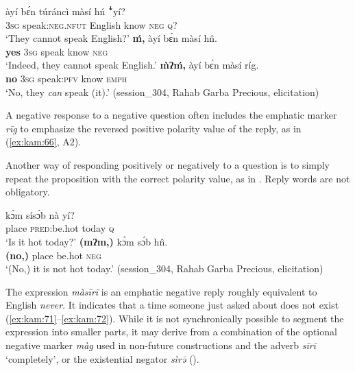 \documentclass[output=paper,colorlinks,citecolor=brown]{langscibook}
\begin{document}
\ea\label{ex:kam:66}
    \begin{xlist}[A2: ]
    \label{ex:kam:66Q}
        \gll àyí bɛ́n túráncì màsí hń ꜜyí?\\
            \textsc{3sg} speak:\textsc{neg}.\textsc{nfut} English know \textsc{neg} \textsc{q}?\\
        \glt ‘They cannot speak English?’
    \label{ex:kam:67}
        \gll \textbf{ḿ,} àyí bɛ́n màsí h\^{n}.\\
            \textbf{yes} \textsc{3sg} speak know \textsc{neg}\\
        \glt ‘Indeed, they cannot speak English.’
    \label{ex:kam:68}
        \gll \textbf{\`{m}ʔḿ,} àyí bɛ́n màsí ríg.\\
            \textbf{no} \textsc{3sg} speak:\textsc{pfv} know \textsc{emph}\\
        \glt  ‘No, they \textit{can} speak (it).’ (session\_304, Rahab Garba Precious, elicitation)
    \end{xlist}
\z 

A negative response to a negative question often includes the emphatic marker \textit{rīg} to emphasize the reversed positive polarity value of the reply, as in (\ref{ex:kam:66}, A2).

Another way of responding positively or negatively to a question is to simply repeat the proposition with the correct polarity value, as in . Reply words are not obligatory.
 
\ea\label{ex:kam:69}
    \begin{xlist}[A2: ]
    \label{ex:kam:69Q}
        \gll kɔ̀m sísɔ́b nà yí?\\
              place \textsc{pred}:be.hot today \textsc{q}\\
        \glt ‘Is it hot today?’
    \label{ex:kam:70}
        \gll \textbf{(mʔm,)} kɔ̀m sɔ́b h\^{n}.\\
            \textbf{(no,)} place be.hot \textsc{neg}\\
        \glt ‘(No,) it is not hot today.’ (session\_304, Rahab Garba Precious, elicitation)
    \end{xlist}
\z 

The expression \textit{màsīrī} is an emphatic negative reply roughly equivalent to English \textit{never}. It indicates that a time someone just asked about does not exist (\ref{ex:kam:71}--\ref{ex:kam:72}). While it is not synchronically possible to segment the expression into smaller parts, it may derive from a combination of the optional negative marker \textit{màg} used in non-future constructions and the adverb \textit{sīrī} ‘completely’, or the existential negator \textit{sìrə̄} ().
\end{document}

